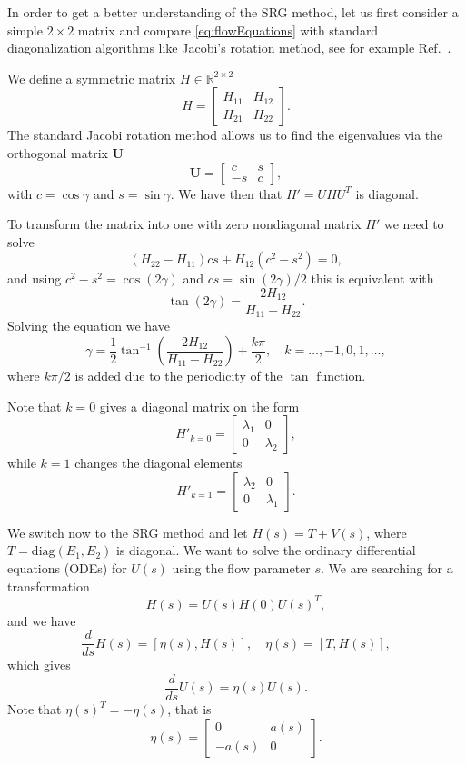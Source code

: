 In order to get a better understanding of the SRG method, let us first consider  
a simple $2\times 2$ matrix and compare \eqref{eq:flowEquations} with standard diagonalization algorithms like 
Jacobi's rotation method, see for example Ref.~\cite{Golub:2013le}.

We define a  symmetric matrix  $H\in {\mathbb{R}}^{2\times 2}$
\[ 
H = \begin{bmatrix} H_{11} & H_{12} \\ H_{21} & H_{22}\end{bmatrix}. 
\]
The standard Jacobi rotation method allows us to find the eigenvalues via the orthogonal matrix
$\mathbf{U}$ 
\[ 
\mathbf{U} = \begin{bmatrix} c & s \\ -s & c
\end{bmatrix}, 
\]
with $c = \cos \gamma$ and $s = \sin \gamma$. We have then that  $H' = UHU^T$ is diagonal. 

To transform the matrix into one with zero  nondiagonal matrix $H'$ we need to solve
\[ 
(H_{22} - H_{11})cs + H_{12}(c^2 - s^2) = 0, 
\]
and using $c^2-s^2 = \cos(2\gamma)$ and $cs = \sin(2\gamma)/2$
this is equivalent with 
\[ \tan(2\gamma) = \frac{2 H_{12}}{H_{11}-H_{22}}. \]
Solving the equation we have
\begin{equation} 
\gamma = \frac{1}{2} \tan^{-1} \left( \frac{2H_{12}}{H_{11}-H_{22}}
\right) + \frac{k\pi}{2}, \quad k=\ldots,-1,0,1,\ldots, \label{eq:0} 
\end{equation}
where $k\pi/2$ is added due to the periodicity of the $\tan$ function.

Note that  $k=0$ gives a diagonal matrix on the form
\begin{equation} 
H'_{k=0} = \begin{bmatrix} \lambda_1 & 0 \\ 0 & \lambda_2 \end{bmatrix},
\label{eq:1} 
\end{equation}
while  $k=1$ changes the diagonal elements  
\begin{equation} 
H'_{k=1} = \begin{bmatrix} \lambda_2 & 0 \\ 0 & \lambda_1 \end{bmatrix}.
\label{eq:2}
\end{equation}

We switch now to the SRG method and 
let $H(s) = T + V(s)$, where $T= \mathrm{diag}(E_1,E_2)$ is diagonal. We want to solve the ordinary differential equations (ODEs) 
for $U(s)$ using the flow parameter $s$. 
We are searching for a transformation 
\[ 
H(s) = U(s)H(0)U(s)^T, 
\]
and we have
\[ 
\frac{d}{ds} H(s) = [\eta(s),H(s)],  \quad \eta(s) = [T,H(s)], 
\]
which gives
\[ 
\frac{d}{ds} U(s) = \eta(s) U(s). 
\]
Note that $\eta(s)^T = -\eta(s)$, that is
\[ 
\eta(s) = \begin{bmatrix} 0 & a(s) \\ -a(s) & 0 \end{bmatrix}. 
\]

